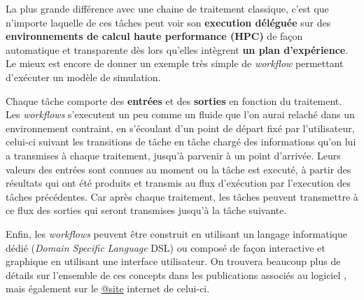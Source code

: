 La plus grande différence avec une chaine de traitement classique, c'est que n'importe laquelle de ces tâches peut voir son \textbf{execution déléguée} sur des \textbf{environnements de calcul haute performance (HPC)} de façon automatique et transparente dès lors qu'elles intègrent \textbf{un plan d'expérience}. Le mieux est encore de donner un exemple très simple de \textit{workflow} permettant d'exécuter un modèle de simulation. 

Chaque tâche comporte des \textbf{entrées} et des \textbf{sorties} en fonction du traitement. Les \textit{workflows} s'executent un peu comme un fluide que l'on aurai relaché dans un environnement contraint, en s'écoulant d'un point de départ fixé par l'utilisateur, celui-ci suivant les transitions de tâche en tâche chargé des informations qu'on lui a transmises à chaque traitement, jusqu'à parvenir à un point d'arrivée. Leurs valeurs des entrées sont connues au moment ou la tâche est executé, à partir des résultats qui ont été produits et transmis au flux d'exécution par l'execution des tâches précédentes. Car après chaque traitement, les tâches peuvent transmettre à ce flux des sorties qui seront transmises jusqu'à la tâche suivante.

Enfin, les \textit{workflows} peuvent être construit en utilisant un langage informatique dédié (\textit{Domain Specific Language} DSL) ou composé de façon interactive et graphique en utilisant une interface utilisateur. On trouvera beaucoup plus de détails sur l'ensemble de ces concepts dans les publications associés au logiciel \autocites{Reuillon2008a, Reuillon2013}, mais également sur le \href{http://www.openmole.org}{@site} internet de celui-ci.

